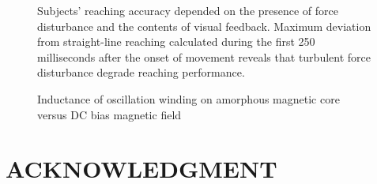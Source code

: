 \documentclass[letterpaper, 10 pt, conference]{ieeeconf}  %
\begin{document}
   \begin{figure}[thpb]
      \centering
      \caption{Subjects' reaching accuracy depended on the presence of force disturbance and the contents of visual feedback. Maximum deviation from straight-line reaching calculated during the first 250 milliseconds after the onset of movement reveals that turbulent force disturbance degrade reaching performance. }
      \label{figurelabel}
   \end{figure}
   
   \begin{figure}[thpb]
      \centering
      \caption{Inductance of oscillation winding on amorphous
       magnetic core versus DC bias magnetic field}
      \label{figurelabel}
   \end{figure}

\section*{ACKNOWLEDGMENT}


\end{document}
